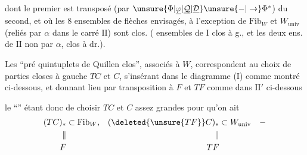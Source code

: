 dont le premier est transposé (par $\unsure{\Phi|\underline{\varphi}|\underline{\mathcal{Q}}|\underline{\mathcal{D}}}\unsure{-|\to}\Phi^*$)
du second, et où les 8 ensembles de
flèches envisagés, à l'exception de $\mathrm{Fib}_W$ et
$W_{\mathrm{univ}}$ (reliés par $\alpha$ dans le carré $\mathrm{II}$)
sont clos. (  ensembles de
$\mathrm I$ clos à g., et les deux ens. de $\mathrm{II}$
non  par $\alpha$, clos à dr.).

Les ``pré quintuplets de Quillen clos'', associés
à $W$, correspondent au choix de
parties closes à gauche $TC$ et $C$,
s'insérant dans le diagramme (I) comme
montré  ci-dessous, et donnant lieu
par transposition à $F$ et $TF$ comme dans
$\mathrm{II}'$ ci-dessous


\unsure{;}

le ``'' étant donc de choisir $TC$ et $C$
assez grandes pour qu'on ait
\[
 \begin{aligned}
 (TC)_*&\subset\mathrm{Fib}_W,&(\deleted{\unsure{TF}}C)_*&\subset W_{\mathrm{univ}}\quad-\\
 \parallel &&\parallel\\
 F&&TF
 \end{aligned}
\]

